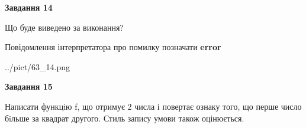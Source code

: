 \documentclass[11pt, ukrainian]{article}
\begin{document}
{\begin {large}
{\begin {center}\textbf{Завдання 14}\end {center}}\par
Що буде виведено за виконання? \par
Повідомлення інтерпретатора про помилку позначати \textbf{error}

\begin{center}
	{../pict/63_14.png}
\end{center}
\newpage

{\begin {center}\textbf{Завдання 15}\end {center}}\par

Написати функцiю f, що отримує 2 числа і повертає ознаку того, що перше число бiльше за квадрат другого. Стиль запису умови також оцінюється.\par
\newpage

\end {large}}
\end{document}
